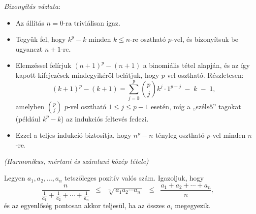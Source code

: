 \begin{solution}
\smallskip{}
\emph{Bizonyítás vázlata}: 
\begin{itemize}
\item Az állítás $n=0$-ra triviálisan igaz. 
\item Tegyük fel, hogy $k^{p}-k$ minden $k\le n$-re osztható $p$-vel,
és bizonyítsuk be ugyanezt $n+1$-re. 
\item Elemzéssel felírjuk $(n+1)^{p}-(n+1)$ a binomiális tétel alapján,
és az így kapott kifejezések mindegyikéről belátjuk, hogy $p$-vel
osztható. Részletesen: 
\[
(k+1)^{p}-(k+1)=\sum_{j=0}^{p}\binom{p}{j}k^{j}\cdot1^{p-j}\;-\;k\;-\;1,
\]
amelyben $\binom{p}{j}$ $p$-vel osztható $1\le j\le p-1$ esetén,
míg a „szélső” tagokat (például $k^{p}-k$) az indukciós feltevés
fedezi. 
\item Ezzel a teljes indukció biztosítja, hogy $n^{p}-n$ tényleg osztható
$p$-vel minden $n$-re. 
\end{itemize}
\end{solution}
\begin{problem}
\emph{(Harmonikus, mértani és számtani közép tétele)}

Legyen $a_{1},a_{2},\dots,a_{n}$ tetszőleges pozitív valós szám.
Igazoljuk, hogy 
\[
\frac{n}{\frac{1}{a_{1}}+\frac{1}{a_{2}}+\cdots+\frac{1}{a_{n}}}\;\;\le\;\;\sqrt[n]{\,a_{1}a_{2}\cdots a_{n}\,}\;\;\le\;\;\frac{a_{1}+a_{2}+\cdots+a_{n}}{n},
\]
és az egyenlőség pontosan akkor teljesül, ha az összes $a_{i}$ megegyezik. 
\end{problem}


